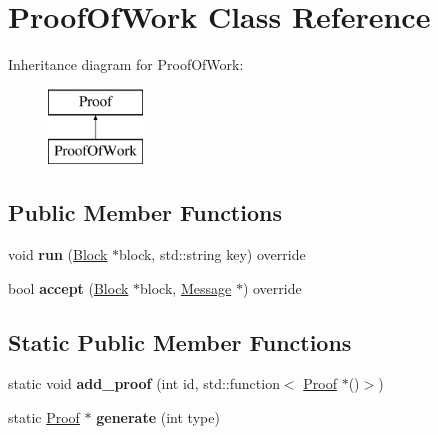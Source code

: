 \hypertarget{classProofOfWork}{}\section{Proof\+Of\+Work Class Reference}
\label{classProofOfWork}
Inheritance diagram for Proof\+Of\+Work\+:\begin{figure}[H]
\begin{center}
\leavevmode
\includegraphics[height=2.000000cm]{classProofOfWork}
\end{center}
\end{figure}
\subsection*{Public Member Functions}
\begin{DoxyCompactItemize}
\item 
\mbox{\label{classProofOfWork_a80cbd012ee3f9e92a8497efac84bf689}} 
void {\bfseries run} (\mbox{\hyperlink{classBlock}{Block}} $\ast$block, std\+::string key) override
\item 
\mbox{\label{classProofOfWork_abe3dba92dad383eec07f70acccaa802d}} 
bool {\bfseries accept} (\mbox{\hyperlink{classBlock}{Block}} $\ast$block, \mbox{\hyperlink{classMessage}{Message}} $\ast$) override
\end{DoxyCompactItemize}
\subsection*{Static Public Member Functions}
\begin{DoxyCompactItemize}
\item 
\mbox{\label{classProof_a93208e5161d25f8533849ac2dac8d6b8}} 
static void {\bfseries add\+\_\+proof} (int id, std\+::function$<$ \mbox{\hyperlink{classProof}{Proof}} $\ast$()$>$)
\item 
\mbox{\label{classProof_a267f0f4587babb59884b5f280e2d54c8}} 
static \mbox{\hyperlink{classProof}{Proof}} $\ast$ {\bfseries generate} (int type)
\end{DoxyCompactItemize}
